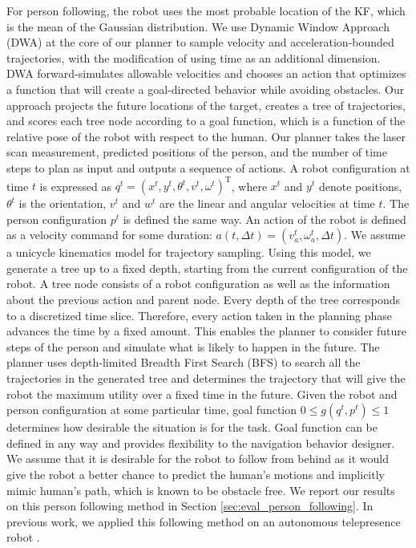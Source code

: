 \documentclass{tADR2e}
\begin{document}
For person following, the robot uses the most probable location of the KF, which is the mean of the Gaussian distribution. We use Dynamic Window Approach (DWA) \cite{fox1997dynamic} at the core of our planner to sample velocity and acceleration-bounded trajectories, with the modification of using time as an additional dimension. DWA forward-simulates allowable velocities and chooses an action that optimizes a function that will create a goal-directed behavior while avoiding obstacles. Our approach projects the future locations of the target, creates a tree of trajectories, and scores each tree node according to a goal function, which is a function of the relative pose of the robot with respect to the human. Our planner takes the laser scan measurement, predicted positions of the person, and the number of time steps to plan as input and outputs a sequence of actions. A robot configuration at time $t$ is expressed as \(q^t=(x^t,y^t,\theta^t,v^t,\omega^t)^\mathrm{T}\), where $x^t$ and $y^t$ denote positions, $\theta^t$ is the orientation, $v^t$ and $w^t$ are the linear and angular velocities at time $t$. The person configuration \(p^t\) is defined the same way. An action of the robot is defined as a velocity command for some duration: $a(t,\Delta t)=(v^t_a,\omega^t_a,\Delta t)$. We assume a unicycle kinematics model for trajectory sampling. Using this model, we generate a tree up to a fixed depth, starting from the current configuration of the robot. A tree node consists of a robot configuration as well as the information about the previous action and parent node. Every depth of the tree corresponds to a discretized time slice. Therefore, every action taken in the planning phase advances the time by a fixed amount. This enables the planner to consider future steps of the person and simulate what is likely to happen in the future. The planner uses depth-limited Breadth First Search (BFS) to search all the trajectories in the generated tree and determines the trajectory that will give the robot the maximum utility over a fixed time in the future. Given the robot and person configuration at some particular time, goal function \(0 \leq g(q^t,p^t) \leq 1\) determines how desirable the situation is for the task. Goal function can be defined in any way and provides flexibility to the navigation behavior designer. We assume that it is desirable for the robot to follow from behind as it would give the robot a better chance to predict the human's motions and implicitly mimic human's path, which is known to be obstacle free. We report our results on this person following method in Section \ref{sec:eval_person_following}. In previous work, we applied this following method on an autonomous telepresence robot \cite{cosgun2013autonomous}. 
\end{document}

